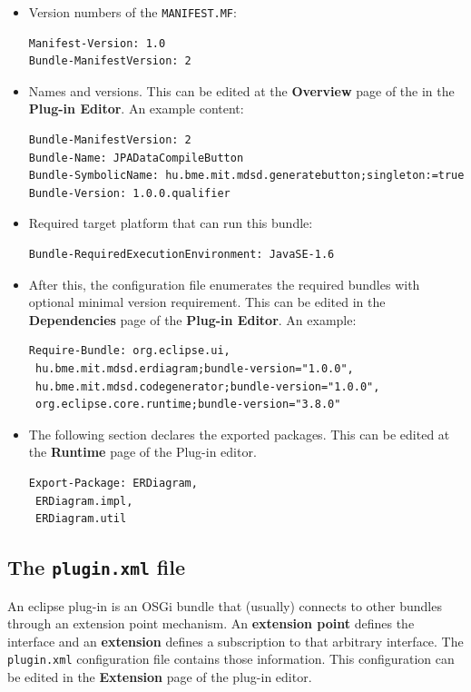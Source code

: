 \documentclass[]{report}
\begin{document}
\begin{itemize}
\item
  Version numbers of the \texttt{MANIFEST.MF}:

\begin{verbatim}
Manifest-Version: 1.0
Bundle-ManifestVersion: 2
\end{verbatim}
\item
  Names and versions. This can be edited at the \textbf{Overview} page
  of the in the \textbf{Plug-in Editor}. An example content:

\begin{verbatim}
Bundle-ManifestVersion: 2
Bundle-Name: JPADataCompileButton
Bundle-SymbolicName: hu.bme.mit.mdsd.generatebutton;singleton:=true
Bundle-Version: 1.0.0.qualifier
\end{verbatim}
\item
  Required target platform that can run this bundle:

\begin{verbatim}
Bundle-RequiredExecutionEnvironment: JavaSE-1.6
\end{verbatim}
\item
  After this, the configuration file enumerates the required bundles
  with optional minimal version requirement. This can be edited in the
  \textbf{Dependencies} page of the \textbf{Plug-in Editor}. An example:

\begin{verbatim}
Require-Bundle: org.eclipse.ui,
 hu.bme.mit.mdsd.erdiagram;bundle-version="1.0.0",
 hu.bme.mit.mdsd.codegenerator;bundle-version="1.0.0",
 org.eclipse.core.runtime;bundle-version="3.8.0"
\end{verbatim}
\item
  The following section declares the exported packages. This can be
  edited at the \textbf{Runtime} page of the Plug-in editor.

\begin{verbatim}
Export-Package: ERDiagram,
 ERDiagram.impl,
 ERDiagram.util
\end{verbatim}
\end{itemize}

\subsection{The \texttt{plugin.xml} file}

An eclipse plug-in is an OSGi bundle that (usually) connects to other
bundles through an extension point mechanism. An \textbf{extension
point} defines the interface and an \textbf{extension} defines a
subscription to that arbitrary interface. The \texttt{plugin.xml}
configuration file contains those information. This configuration can be
edited in the \textbf{Extension} page of the plug-in editor.
\end{document}
